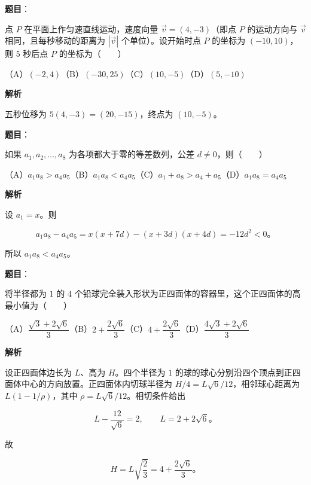 \begin{answer}

\textbf{题目}：

点 $P$ 在平面上作匀速直线运动，速度向量 $\vec v=(4,-3)$（即点 $P$ 的运动方向与 $\vec v$ 相同，且每秒移动的距离为 $|\vec v|$ 个单位）。设开始时点 $P$ 的坐标为 $(-10,10)$，则 $5$ 秒后点 $P$ 的坐标为\mbox{（　　）}

（A）$(-2,4)$\quad（B）$(-30,25)$\quad（C）$(10,-5)$\quad（D）$(5,-10)$

\textbf{解析}

五秒位移为 $5(4,-3)=(20,-15)$，终点为 $(10,-5)$。


\end{answer}
\begin{answer}

\textbf{题目}：

如果 $a_1,a_2,\ldots,a_8$ 为各项都大于零的等差数列，公差 $d\ne0$，则\mbox{（　　）}

（A）$a_1a_8>a_4a_5$\quad（B）$a_1a_8<a_4a_5$\quad（C）$a_1+a_8>a_4+a_5$\quad（D）$a_1a_8=a_4a_5$

\textbf{解析}

设 $a_1=x$。则

\nopagebreak[4]
\[
a_1a_8-a_4a_5
=x(x+7d)-(x+3d)(x+4d)
=-12d^2<0\text{。}
\]

所以 $a_1a_8<a_4a_5$。


\end{answer}
\begin{answer}

\textbf{题目}：

将半径都为 $1$ 的 $4$ 个铅球完全装入形状为正四面体的容器里，这个正四面体的高最小值为\mbox{（　　）}

（A）$\dfrac{\sqrt3+2\sqrt6}{3}$\quad（B）$2+\dfrac{2\sqrt6}{3}$\quad（C）$4+\dfrac{2\sqrt6}{3}$\quad（D）$\dfrac{4\sqrt3+2\sqrt6}{3}$

\textbf{解析}

设正四面体边长为 $L$、高为 $H$。四个半径为 $1$ 的球的球心分别沿四个顶点到正四面体中心的方向放置。正四面体内切球半径为 $H/4=L\sqrt6/12$，相邻球心距离为 $L(1-1/\rho)$，其中 $\rho=L\sqrt6/12$。相切条件给出

\nopagebreak[4]
\[
L-\frac{12}{\sqrt6}=2,
\qquad L=2+2\sqrt6\text{。}
\]

故

\nopagebreak[4]
\[
H=L\sqrt{\frac23}=4+\frac{2\sqrt6}{3}\text{。}
\]


\end{answer}
